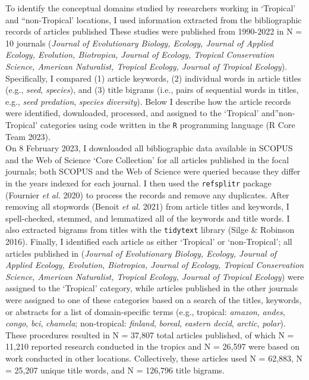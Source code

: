 \documentclass[
  12pt,
  man, donotrepeattitle,floatsintext]{apa6}
\begin{document}
\noindent To identify the conceptual domains studied by researchers working in `Tropical' and ``non-Tropical' locations, I used information extracted from the bibliographic records of articles published These studies were published from 1990-2022 in N = 10 journals (\emph{Journal of Evolutionary Biology, Ecology, Journal of Applied Ecology, Evolution, Biotropica, Journal of Ecology, Tropical Conservation Science, American Naturalist, Tropical Ecology, Journal of Tropical Ecology}). Specifically, I compared (1) article keywords, (2) individual words in article titles (e.g., \emph{seed}, \emph{species}), and (3) title bigrams (i.e., pairs of sequential words in titles, e.g., \emph{seed predation}, \emph{species diversity}). Below I describe how the article records were identified, downloaded, processed, and assigned to the `Tropical' and''non-Tropical' categories using code written in the \texttt{R} programming language (R Core Team 2023).\\
On 8 February 2023, I downloaded all bibliographic data available in SCOPUS and the Web of Science `Core Collection' for all articles published in the focal journals; both SCOPUS and the Web of Science were queried because they differ in the years indexed for each journal. I then used the \texttt{refsplitr} package (Fournier \emph{et al.} 2020) to process the records and remove any duplicates. After removing all stopwords (Benoit \emph{et al.} 2021) from article titles and keywords, I spell-checked, stemmed, and lemmatized all of the keywords and title words. I also extracted bigrams from titles with the \texttt{tidytext} library (Silge \& Robinson 2016). Finally, I identified each article as either `Tropical' or `non-Tropical'; all articles published in (\emph{Journal of Evolutionary Biology, Ecology, Journal of Applied Ecology, Evolution, Biotropica, Journal of Ecology, Tropical Conservation Science, American Naturalist, Tropical Ecology, Journal of Tropical Ecology}) were assigned to the `Tropical' category, while articles published in the other journals were assigned to one of these categories based on a search of the titles, keywords, or abstracts for a list of domain-specific terms (e.g., tropical: \emph{amazon}, \emph{andes}, \emph{congo}, \emph{bci}, \emph{chamela}; non-tropical: \emph{finland}, \emph{boreal}, \emph{eastern decid}, \emph{arctic}, \emph{polar}). These procedures resulted in N = 37,807 total articles published, of which N = 11,210 reported research conducted in the tropics and N = 26,597 were based on work conducted in other locations. Collectively, these articles used N = 62,883, N = 25,207 unique title words, and N = 126,796 title bigrams.\\
\end{document}
